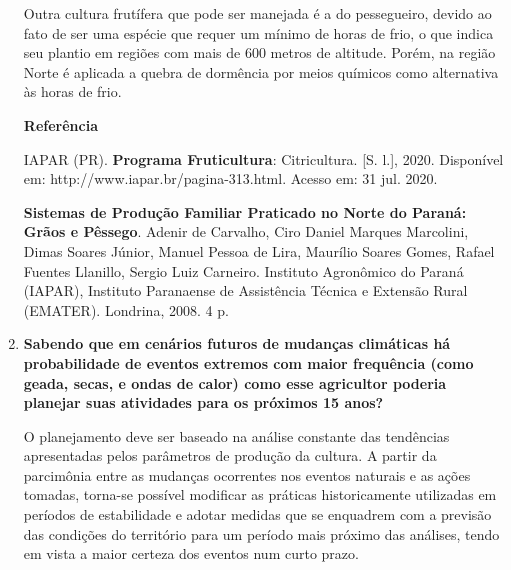 \documentclass[a4paper, 12pt, brazilian]{article}
\begin{document}
\begin{enumerate}
		\hspace{.5cm}Outra cultura frutífera que pode ser manejada é a do pessegueiro, devido ao fato de ser uma espécie que requer um mínimo de horas de frio, o que indica seu plantio em regiões com mais de 600 metros de altitude. Porém, na região Norte é aplicada a quebra de dormência por meios químicos como alternativa às horas de frio.
		
		\textbf{Referência}
		
		IAPAR (PR). \textbf{Programa Fruticultura}: Citricultura. [S. l.], 2020. Disponível em: http://w\-ww.iapar.br/pagina-313.html. Acesso em: 31 jul. 2020.
		
		\textbf{Sistemas de Produção Familiar Praticado no Norte do Paraná: Grãos e Pêssego}. Adenir de Carvalho, Ciro Daniel Marques Marcolini,
		Dimas Soares Júnior, Manuel Pessoa de Lira, Maurílio Soares Gomes, Rafael Fuentes Llanillo, Sergio Luiz Carneiro. Instituto Agronômico do
		Paraná (IAPAR), Instituto Paranaense de Assistência Técnica e Extensão Rural (EMATER). Londrina, 2008. 4 p.
		
		\item\textbf{Sabendo que em cenários futuros de mudanças climáticas há probabilidade de eventos extremos com maior frequência (como geada, secas, e ondas de calor) como esse agricultor poderia planejar suas atividades para os próximos 15 anos?}
		
		\hspace{.5cm}O planejamento deve ser baseado na análise constante das tendências apresentadas pelos parâmetros de produção da cultura. A partir da parcimônia entre as mudanças ocorrentes nos eventos naturais e as ações tomadas, torna-se possível modificar as práticas historicamente utilizadas em períodos de estabilidade e adotar medidas que se enquadrem com a previsão das condições do território para um período mais próximo das análises, tendo em vista a maior certeza dos eventos num curto prazo. 
	\end{enumerate}
\end{document}
